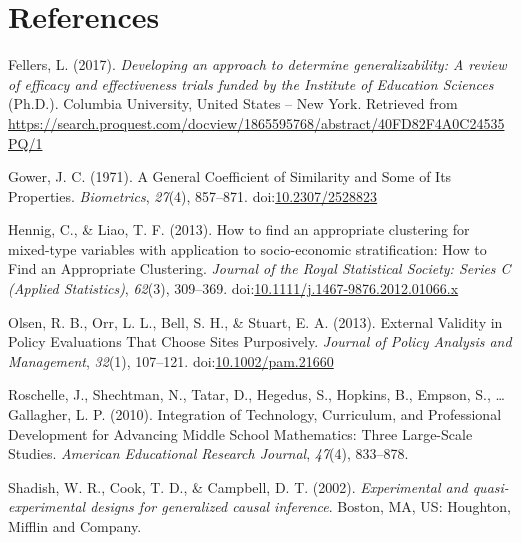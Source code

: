 \documentclass[man,floatsintext]{apa6}
\begin{document}
\newpage

\hypertarget{references}{%
\section{References}\label{references}}

\begingroup
\setlength{\parindent}{-0.5in}
\setlength{\leftskip}{0.5in}

\hypertarget{refs}{}
\leavevmode\hypertarget{ref-fellersDevelopingApproachDetermine2017}{}%
Fellers, L. (2017). \emph{Developing an approach to determine generalizability: A review of efficacy and effectiveness trials funded by the Institute of Education Sciences} (Ph.D.). Columbia University, United States -- New York. Retrieved from \url{https://search.proquest.com/docview/1865595768/abstract/40FD82F4A0C24535PQ/1}

\leavevmode\hypertarget{ref-gowerGeneralCoefficientSimilarity1971}{}%
Gower, J. C. (1971). A General Coefficient of Similarity and Some of Its Properties. \emph{Biometrics}, \emph{27}(4), 857--871. doi:\href{https://doi.org/10.2307/2528823}{10.2307/2528823}

\leavevmode\hypertarget{ref-hennigHowFindAppropriate2013}{}%
Hennig, C., \& Liao, T. F. (2013). How to find an appropriate clustering for mixed-type variables with application to socio-economic stratification: How to Find an Appropriate Clustering. \emph{Journal of the Royal Statistical Society: Series C (Applied Statistics)}, \emph{62}(3), 309--369. doi:\href{https://doi.org/10.1111/j.1467-9876.2012.01066.x}{10.1111/j.1467-9876.2012.01066.x}

\leavevmode\hypertarget{ref-olsenExternalValidityPolicy2013}{}%
Olsen, R. B., Orr, L. L., Bell, S. H., \& Stuart, E. A. (2013). External Validity in Policy Evaluations That Choose Sites Purposively. \emph{Journal of Policy Analysis and Management}, \emph{32}(1), 107--121. doi:\href{https://doi.org/10.1002/pam.21660}{10.1002/pam.21660}

\leavevmode\hypertarget{ref-roschelleIntegrationTechnologyCurriculum2010}{}%
Roschelle, J., Shechtman, N., Tatar, D., Hegedus, S., Hopkins, B., Empson, S., \ldots{} Gallagher, L. P. (2010). Integration of Technology, Curriculum, and Professional Development for Advancing Middle School Mathematics: Three Large-Scale Studies. \emph{American Educational Research Journal}, \emph{47}(4), 833--878.

\leavevmode\hypertarget{ref-shadishExperimentalQuasiexperimentalDesigns2002}{}%
Shadish, W. R., Cook, T. D., \& Campbell, D. T. (2002). \emph{Experimental and quasi-experimental designs for generalized causal inference}. Boston, MA, US: Houghton, Mifflin and Company.
\end{document}
